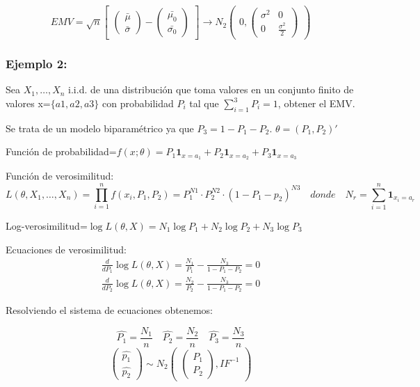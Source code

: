 \[ EMV=\sqrt{n}
\begin{bmatrix}
    \begin{pmatrix}
        \bar{\mu}\\
        \bar{\sigma}
    \end{pmatrix}
    -
    \begin{pmatrix}
        \bar{\mu_0}\\
        \bar{\sigma_0}
    \end{pmatrix}
\end{bmatrix}
\to
N_2
\begin{pmatrix}
    0,
    \begin{pmatrix}
        \sigma^2 & 0\\
        0 & \frac{\sigma^2}{2}
    \end{pmatrix}
        
    \end{pmatrix}
\]

\subsubsection*{Ejemplo 2:}
Sea $X_1,\dots,X_n$ i.i.d. de una distribución que toma valores en un conjunto finito de valores x=$\{a1,a2,a3\}$ con probabilidad
$P_i$ tal que $\sum_{i=1}^{3} P_i=1$, obtener el EMV.

Se trata de un modelo biparamétrico ya que $P_3=1-P_1-P_2$. $\theta=(P_1,P_2)'$

Función de probabilidad=$f(x; \theta) = P_1 \mathbf{1}_{x = a_1} + P_2 \mathbf{1}_{x = a_2} + P_3 \mathbf{1}_{x = a_3}$

Función de verosimilitud:
\[L(\theta,X_1,\dots,X_n)=\prod_{i=1}^{n}f(x_i,P_1,P_2)=P_1^{N1}\cdot P_2^{N2} \cdot (1-P_1-p_2)^{N3}
\quad donde \quad N_r=\sum_{i=1}^{n} \mathbf{1}_{x_i=a_r}
\]

Log-verosimilitud=$ \log L(\theta,X)=N_1 \log P_1 + N_2 \log P_2 +N_3 \log P_3$

Ecuaciones de verosimilitud:
\[
\begin{matrix}
    \frac{d}{dP_1} \log L(\theta,X)=\frac{N_1}{P_1}-\frac{N_3}{1-P_1-P_2}=0
    \\ \frac{d}{dP_2} \log L(\theta,X)=\frac{N_2}{P_2}-\frac{N_3}{1-P_1-P_2}=0
    
\end{matrix}
\]

Resolviendo el sistema de ecuaciones obtenemos:

\[
\widehat{P_1}=\frac{N_1}{n} \quad \widehat{P_2}=\frac{N_2}{n} \quad \widehat{P_3}=\frac{N_3}{n}
\]
\[
\begin{pmatrix}
    \widehat{p_1} \\
    \widehat{p_2}
\end{pmatrix}
\sim
N_2
\begin{pmatrix}
    \begin{pmatrix}
        P_1 \\
        P_2
    \end{pmatrix}
, IF^{-1}
\end{pmatrix}
\]

